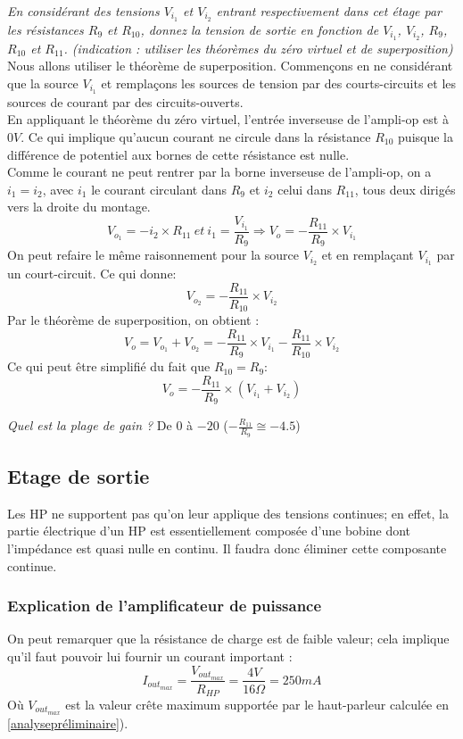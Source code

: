 {
\textit{En considérant des tensions $V_{{i}_1}$ et $V_{{i}_2}$ entrant respectivement dans cet étage par les résistances $R_9$ et $R_{10}$, donnez la tension de sortie en fonction de $V_{{i}_1}$, $V_{{i}_2}$, $R_9$, $R_{10}$ et $R_{11}$. (indication : utiliser les théorèmes du zéro virtuel et de superposition)}
}
{%
Nous allons utiliser le théorème de superposition. Commençons en ne considérant que
la source $V_{{i}_1}$ et remplaçons les sources de tension par des courts-circuits et les sources de courant par des circuits-ouverts.\\

En appliquant le théorème du zéro virtuel, l'entrée inverseuse de l’ampli-op est à $0V$. Ce qui implique qu'aucun courant ne circule dans la résistance $R_{10}$ puisque la différence de potentiel aux bornes de cette résistance est nulle.\\
Comme le courant ne peut rentrer par la borne inverseuse de l’ampli-op, on a $i_1 = i_2$, avec $i_1$ le courant circulant dans $R_9$ et $i_2$ celui dans
$R_{11}$, tous deux dirigés vers la droite du montage.
$$V_{o_1}=-i_2\times R_{11}\ et\ i_1=\frac{V_{{i}_1}}{R_9} \Rightarrow V_o=-\frac{R_{11}}{R_9}\times V_{{i}_1}$$
On peut refaire le même raisonnement pour la source $V_{{i}_2}$ et en remplaçant $V_{{i}_1}$ par un court-circuit. Ce qui donne:
$$V_{o_2}=-\frac{R_{11}}{R_{10}}\times V_{{i}_2}$$
Par le théorème de superposition, on obtient :
$$V_o=V_{o_1}+V_{o_2}=-\frac{R_{11}}{R_9}\times V_{{i}_1}-\frac{R_{11}}{R_{10}}\times V_{{i}_2}$$
Ce qui peut être simplifié du fait que $R_{10} = R_9$:
$$V_o=-\frac{R_{11}}{R_9}\times (V_{{i}_1}+V_{{i}_2})$$
}

{
\textit{Quel est la plage de gain ?}
}
{%
De $0$ à $-20$ ($-\frac{R_{11}}{R_9}\cong -4.5$)
}

\subsection{Etage de sortie}
Les HP ne supportent pas qu'on leur applique des tensions continues; en effet, la partie électrique d'un HP est essentiellement composée d'une bobine dont l'impédance est quasi nulle en continu. Il faudra donc éliminer cette composante continue.
\subsubsection{Explication de l'amplificateur de puissance}
On peut remarquer que la résistance de charge est de faible valeur; cela implique qu'il faut pouvoir lui fournir un courant important :
$$I_{{out}_{max}}=\frac{V_{{out}_{max}}}{R_{HP}}=\frac{4V}{16\Omega}=250mA$$
Où $V_{{out}_{max}}$ est la valeur crête maximum supportée par le haut-parleur
calculée en \ref{analysepréliminaire}).\\

